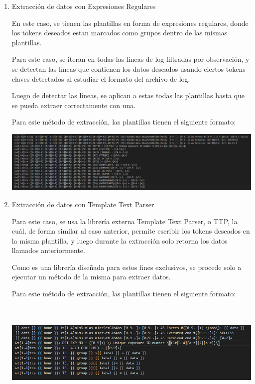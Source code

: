 \begin{enumerate}

    \item{Extracción de datos con Expresiones Regulares}
    
    En este caso, se tienen las plantillas en forma de expresiones regulares, donde los tokens deseados estan marcados como grupos dentro de las mismas plantillas.

    Para este caso, se iteran en todas las líneas de log filtradas por observación, y se detectan las líneas que contienen los datos deseados usando ciertos tokens claves detectados al estudiar el formato del archivo de log.

    Luego de detectar las líneas, se aplican a estas todas las plantillas hasta que se pueda extraer correctamente con una.

    Para este método de extracción, las plantillas tienen el siguiente formato:

    \includegraphics[width=13cm,height=3cm]{figures/plantillas_regex.png} \\

    \item{Extracción de datos con Template Text Parser}

    Para este caso, se usa la librería externa Template Text Parser, o TTP, la cuál, de forma similar al caso anterior, permite escribir los tokens deseados en la misma plantilla, y luego durante la extracción solo retorna los datos llamados anteriormente.

    Como es una librería diseñada para estos fines exclusivos, se procede solo a ejecutar un método de la misma para extraer datos.

    Para este método de extracción, las plantillas tienen el siguiente formato:

    \includegraphics[width=13cm,height=5cm]{figures/plantillas_ttp.png} \\

\end{enumerate}

